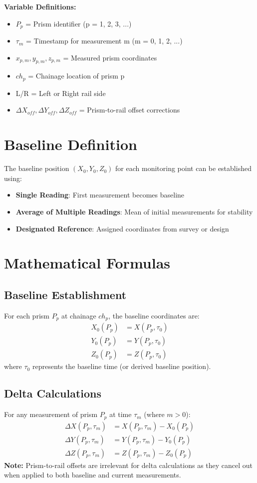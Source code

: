 \documentclass{article}
\begin{document}
\textbf{Variable Definitions:}
\begin{itemize}
\item $P_p$ = Prism identifier (p = 1, 2, 3, ...)
\item $\tau_m$ = Timestamp for measurement m (m = 0, 1, 2, ...)
\item $x_{p,m}, y_{p,m}, z_{p,m}$ = Measured prism coordinates
\item $ch_p$ = Chainage location of prism p
\item L/R = Left or Right rail side
\item $\Delta X_{off}, \Delta Y_{off}, \Delta Z_{off}$ = Prism-to-rail offset corrections
\end{itemize}

\section{Baseline Definition}
The baseline position $(X_0, Y_0, Z_0)$ for each monitoring point can be established using:
\begin{itemize}
\item \textbf{Single Reading}: First measurement becomes baseline
\item \textbf{Average of Multiple Readings}: Mean of initial measurements for stability
\item \textbf{Designated Reference}: Assigned coordinates from survey or design
\end{itemize}

\section{Mathematical Formulas}

\subsection{Baseline Establishment}
For each prism $P_p$ at chainage $ch_p$, the baseline coordinates are:
\begin{align}
X_0(P_p) &= X(P_p, \tau_0) \\
Y_0(P_p) &= Y(P_p, \tau_0) \\
Z_0(P_p) &= Z(P_p, \tau_0)
\end{align}
where $\tau_0$ represents the baseline time (or derived baseline position).

\subsection{Delta Calculations}
For any measurement of prism $P_p$ at time $\tau_m$ (where $m > 0$):
\begin{align}
\Delta X(P_p, \tau_m) &= X(P_p, \tau_m) - X_0(P_p) \\
\Delta Y(P_p, \tau_m) &= Y(P_p, \tau_m) - Y_0(P_p) \\
\Delta Z(P_p, \tau_m) &= Z(P_p, \tau_m) - Z_0(P_p)
\end{align}
\textbf{Note:} Prism-to-rail offsets are irrelevant for delta calculations as they cancel out when applied to both baseline and current measurements.
\end{document}
